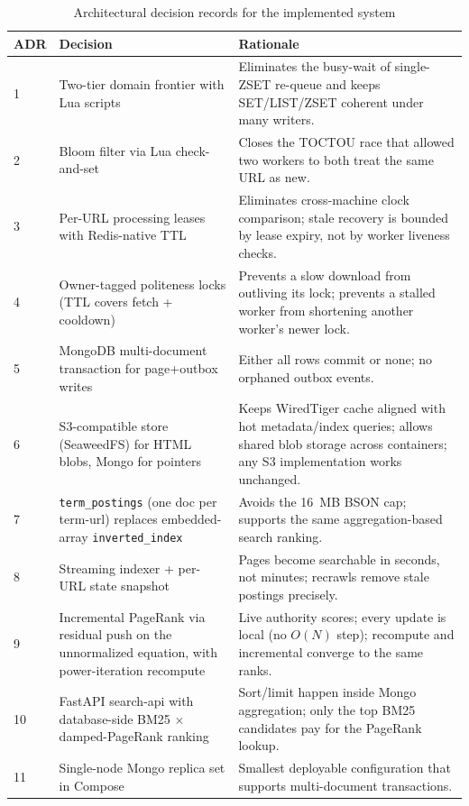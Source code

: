 \documentclass[11pt,a4paper]{article}
\newcommand{\code}[1]{\texttt{#1}}
\begin{document}
\begin{table}[H]
\centering
\caption{Architectural decision records for the implemented system}
\begin{tabular}{p{}p{}p{}}
\toprule
ADR & Decision & Rationale \\
\midrule
1 & Two-tier domain frontier with Lua scripts & Eliminates the busy-wait of single-ZSET re-queue and keeps SET/LIST/ZSET coherent under many writers.\\
2 & Bloom filter via Lua check-and-set & Closes the TOCTOU race that allowed two workers to both treat the same URL as new.\\
3 & Per-URL processing leases with Redis-native TTL & Eliminates cross-machine clock comparison; stale recovery is bounded by lease expiry, not by worker liveness checks.\\
4 & Owner-tagged politeness locks (TTL covers fetch + cooldown) & Prevents a slow download from outliving its lock; prevents a stalled worker from shortening another worker's newer lock.\\
5 & MongoDB multi-document transaction for page+outbox writes & Either all rows commit or none; no orphaned outbox events.\\
6 & S3-compatible store (SeaweedFS) for HTML blobs, Mongo for pointers & Keeps WiredTiger cache aligned with hot metadata/index queries; allows shared blob storage across containers; any S3 implementation works unchanged.\\
7 & \code{term\_postings} (one doc per term-url) replaces embedded-array \code{inverted\_index} & Avoids the 16~MB BSON cap; supports the same aggregation-based search ranking.\\
8 & Streaming indexer + per-URL state snapshot & Pages become searchable in seconds, not minutes; recrawls remove stale postings precisely.\\
9 & Incremental PageRank via residual push on the unnormalized equation, with power-iteration recompute & Live authority scores; every update is local (no $O(N)$ step); recompute and incremental converge to the same ranks.\\
10 & FastAPI search-api with database-side BM25 $\times$ damped-PageRank ranking & Sort/limit happen inside Mongo aggregation; only the top BM25 candidates pay for the PageRank lookup.\\
11 & Single-node Mongo replica set in Compose & Smallest deployable configuration that supports multi-document transactions.\\

\end{tabular}
\end{table}
\end{document}
